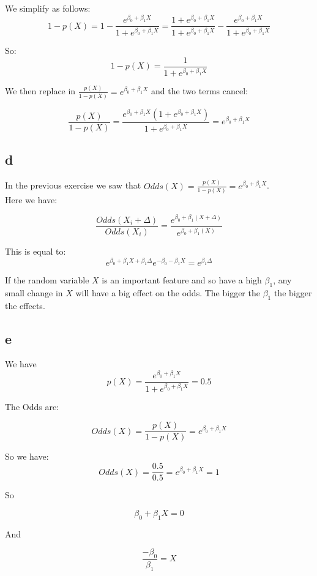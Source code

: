 We simplify as follows:
\[ 1 - p(X) = 1 - \frac{e^{\beta_0 + \beta_1 X}}{1 + e^{\beta_0 + \beta_1 X}} = \frac{1 + e^{\beta_0 + \beta_1 X}}{1 + e^{\beta_0 + \beta_1 X}} - \frac{e^{\beta_0 + \beta_1 X}}{1 + e^{\beta_0 + \beta_1 X}}\]

So: 
\[ 1 - p(X) = \frac{1}{1 + e^{\beta_0 + \beta_1 X}} \]

We then replace in $\frac{p(X)}{1 - p(X)} = e^{\beta_0 + \beta_1 X}  $ and the two terms cancel:

\[ \frac{p(X)}{1 - p(X)} = \frac{e^{\beta_0 + \beta_1 X} (1 + e^{\beta_0 + \beta_1 X} )}{1 + e^{\beta_0 + \beta_1 X}} = e^{\beta_0 + \beta_1 X}  \]


\subsection*{d}

In the previous exercise we saw that $Odds(X) = \frac{p(X)}{1 - p(X)} = e^{\beta_0 + \beta_1 X} $.\\


Here we have: 

\[ \frac{Odds(X_i + \Delta)}{Odds(X_i)} = \frac{e^{\beta_0 + \beta_1 (X + \Delta)}}{e^{\beta_0 + \beta_1 (X)}} \]

This is equal to: 
\[ e^{\beta_0 + \beta_1 X + \beta_1 \Delta}  e^{-\beta_0 - \beta_1 X} = e^{\beta_1 \Delta} \]

If the random variable $X$ is an important feature and so have a high $\beta_1$, any small change in $X$ will have a big effect on the odds. The bigger the $\beta_1$ the bigger the effects. 

\subsection*{e}



We have 
\[  p(X) = \frac{e^{\beta_0 + \beta_1 X}}{1 + e^{\beta_0 + \beta_1 X}} = 0.5 \]

The Odds are: 

\[ Odds(X) = \frac{p(X)}{1 - p(X)} = e^{\beta_0 + \beta_1 X}  \]

So we have: 
\[ Odds(X) = \frac{0.5}{0.5} = e^{\beta_0 + \beta_1 X} = 1 \]

So

\[ \beta_0 + \beta_1 X = 0 \]

And

\[ \frac{-\beta_0}{\beta_1} = X \]

